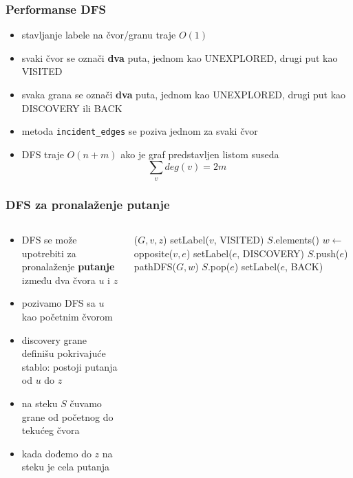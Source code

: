 \documentclass[compress,aspectratio=169]{beamer}
\begin{document}
\begin{frame}[fragile]
  \frametitle{Performanse DFS}
  \begin{itemize}
    \item stavljanje labele na čvor/granu traje $O(1)$
    \item svaki čvor se označi \textbf{dva} puta, jednom kao {\scriptsize 
      UNEXPLORED}, drugi put kao {\scriptsize VISITED}
    \item svaka grana se označi \textbf{dva} puta, jednom kao {\scriptsize 
      UNEXPLORED}, drugi put kao {\scriptsize DISCOVERY} ili 
      {\scriptsize BACK}
    \item metoda \texttt{incident\_edges} se poziva jednom za svaki čvor
    \item DFS traje $O(n+m)$ ako je graf predstavljen listom suseda
    $$\sum_{v}deg(v)=2m$$
  \end{itemize}
\end{frame}

\begin{frame}[fragile]
  \frametitle{DFS za pronalaženje putanje}
  {\footnotesize
  \begin{columns}
    \begin{column}[t]{8cm}
      \begin{itemize}
        \item DFS se može upotrebiti za pronalaženje \textbf{putanje} 
          između dva čvora $u$ i $z$
        \item pozivamo DFS sa $u$ kao početnim čvorom
        \item discovery grane definišu pokrivajuće stablo: postoji putanja od $u$ do $z$
        \item na steku $S$ čuvamo grane od početnog do tekućeg čvora
        \item kada dođemo do $z$ na steku je cela putanja
      \end{itemize}
    \end{column}
    \begin{column}[t]{8cm}
      \begin{algorithmic}
        \STATE {}($G,v,z$)
        \STATE setLabel($v$, {\scriptsize VISITED})
          \RETURN $S$.elements()
        \ENDIF
            \STATE $w \leftarrow$ opposite($v,e$)
              \STATE setLabel($e$, {\scriptsize DISCOVERY})
              \STATE $S$.push($e$)
              \STATE pathDFS($G, w$)
              \STATE $S$.pop($e$)
            \ELSE
              \STATE setLabel($e$, {\scriptsize BACK})
            \ENDIF
          \ENDIF
        \ENDFOR
      \end{algorithmic}
    \end{column}
  \end{columns}
  }
\end{frame}
\end{document}
